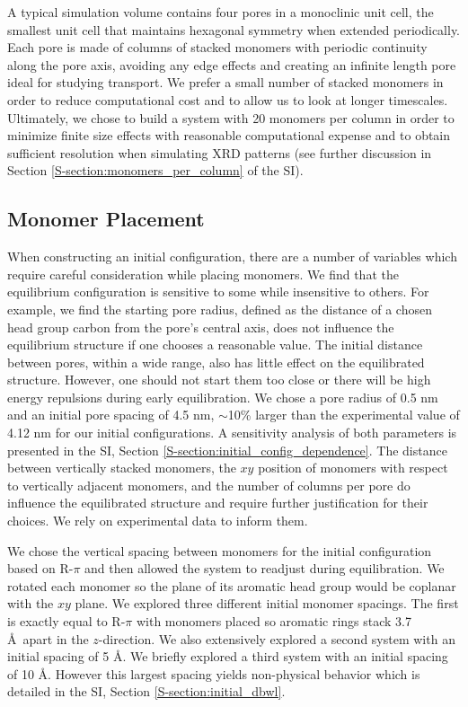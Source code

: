 \documentclass[journal=jpcbfk,manuscript=article]{achemso}
\begin{document}
  A typical simulation volume contains four pores in a monoclinic unit cell,
  the smallest unit cell that maintains hexagonal symmetry when extended
  periodically. Each pore is made of columns of stacked monomers with periodic
  continuity along the pore axis, avoiding any edge effects and creating an
  infinite length pore ideal for studying transport. We prefer a small number of stacked
  monomers in order to reduce computational cost and to allow us to look at
  longer timescales. Ultimately, we chose to build a system with 20 monomers
  per column in order to minimize finite size effects with reasonable computational expense 
  and to obtain sufficient resolution when simulating XRD patterns (see further discussion
  in Section \ref{S-section:monomers_per_column} of the SI).
 
  \subsection{Monomer Placement}\label{method:monomer_placement}

  When constructing an initial configuration, there are a number of variables
  which require careful consideration while placing monomers. We find that the
  equilibrium configuration is sensitive to some while insensitive to others. For
  example, we find the starting pore radius, defined as the distance of a chosen
  head group carbon from the pore's central axis, does not influence the
  equilibrium structure if one chooses a reasonable value. The initial distance
  between pores, within a wide range, also has little effect on the equilibrated
  structure. However, one should not start them too close or there will be high
  energy repulsions during early equilibration. We chose a pore radius of 0.5 nm
  and an initial pore spacing of 4.5 nm, $\sim$10\% larger than the experimental
  value of 4.12 nm for our initial configurations. A sensitivity analysis of both
  parameters is presented in the SI, Section
  \ref{S-section:initial_config_dependence}. The distance between vertically
  stacked monomers, the $xy$ position of monomers with respect to vertically
  adjacent monomers, and the number of columns per pore do influence the
  equilibrated structure and require further justification for their choices. We
  rely on experimental data to inform them. 

  We chose the vertical spacing between monomers for the initial configuration
  based on R-$\pi$ and then allowed the system to readjust during equilibration.
  We rotated each monomer so the plane of its aromatic head group would be
  coplanar with the $xy$ plane. We explored three different initial monomer
  spacings. The first is exactly equal to R-$\pi$ with monomers placed so
  aromatic rings stack 3.7 \AA~apart in the $z$-direction. We also extensively
  explored a second system with an initial spacing of 5 \AA. We briefly explored
  a third system with an initial spacing of 10 \AA. However this largest spacing
  yields non-physical behavior which is detailed in the SI, Section
  \ref{S-section:initial_dbwl}. 
\end{document}
